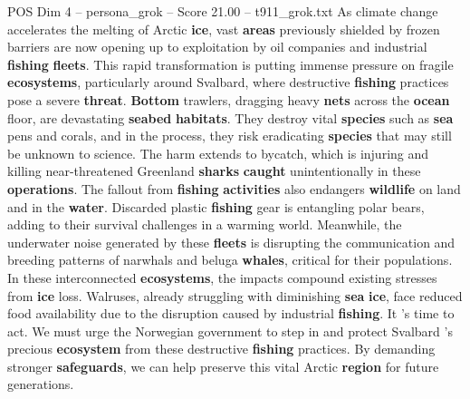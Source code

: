 \begin{textsample}{POS Dim 4 – persona\_grok – Score 21.00 – t911\_grok.txt}  \label{ex:f4_pos_031}
As climate change accelerates the melting of Arctic \textbf{ice}, vast \textbf{areas} previously shielded by frozen barriers are now opening up to exploitation by oil companies and industrial \textbf{fishing} \textbf{fleets}.
This rapid transformation is putting immense pressure on fragile \textbf{ecosystems}, particularly around Svalbard, where destructive \textbf{fishing} practices pose a severe \textbf{threat}. \textbf{Bottom} trawlers, dragging heavy \textbf{nets} across the \textbf{ocean} floor, are devastating \textbf{seabed} \textbf{habitats}.
They destroy vital \textbf{species} such as \textbf{sea} pens and corals, and in the process, they risk eradicating \textbf{species} that may still be unknown to science.
The harm extends to bycatch, which is injuring and killing near-threatened Greenland \textbf{sharks} \textbf{caught} unintentionally in these \textbf{operations}.
The fallout from \textbf{fishing} \textbf{activities} also endangers \textbf{wildlife} on land and in the \textbf{water}.
Discarded plastic \textbf{fishing} gear is entangling polar bears, adding to their survival challenges in a warming world.
Meanwhile, the underwater noise generated by these \textbf{fleets} is disrupting the communication and breeding patterns of narwhals and beluga \textbf{whales}, critical for their populations.
In these interconnected \textbf{ecosystems}, the impacts compound existing stresses from \textbf{ice} loss.
Walruses, already struggling with diminishing \textbf{sea} \textbf{ice}, face reduced food availability due to the disruption caused by industrial \textbf{fishing}.
It 's time to act.
We must urge the Norwegian government to step in and protect Svalbard 's precious \textbf{ecosystem} from these destructive \textbf{fishing} practices.
By demanding stronger \textbf{safeguards}, we can help preserve this vital Arctic \textbf{region} for future generations.

\end{textsample}
